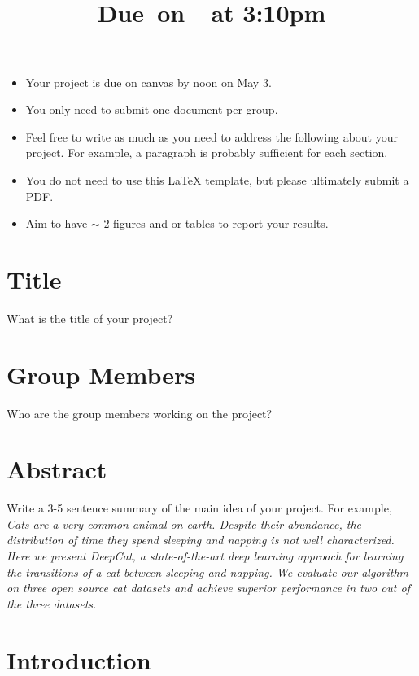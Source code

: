 \documentclass{article}
\title{
    \vspace{2in}
    \textmd{\textbf{\hmwkClass\hmwkTitle}}\\
    \normalsize\vspace{0.1in}\small{Due\ on\ \hmwkDueDate\ at 3:10pm}\\
    \vspace{3in}
}
\author{\hmwkAuthorName}
\date{}
\begin{document}

\begin{itemize}
\item Your project is due on canvas by noon on May 3. 
\item You only need to submit one document per group.
\item Feel free to write as much as you need to address the following about your project. For example, a paragraph is probably sufficient for each section. 
\item You do not need to use this LaTeX template, but please ultimately submit a PDF. 
\item Aim to have $\sim$ 2 figures and or tables to report your results. 
\end{itemize}

\section{Title}

What is the title of your project?

\section{Group Members}

Who are the group members working on the project? 

\section{Abstract}

Write a 3-5 sentence summary of the main idea of your project. For example, \\

\emph{Cats are a very common animal on earth. Despite their abundance, the distribution of time they spend sleeping and napping is not well characterized. Here we present DeepCat, a state-of-the-art deep learning approach for learning the transitions of a cat between sleeping and napping. We evaluate our algorithm on three open source cat datasets and achieve superior performance in two out of the three datasets.}

\section{Introduction}
\end{document}
